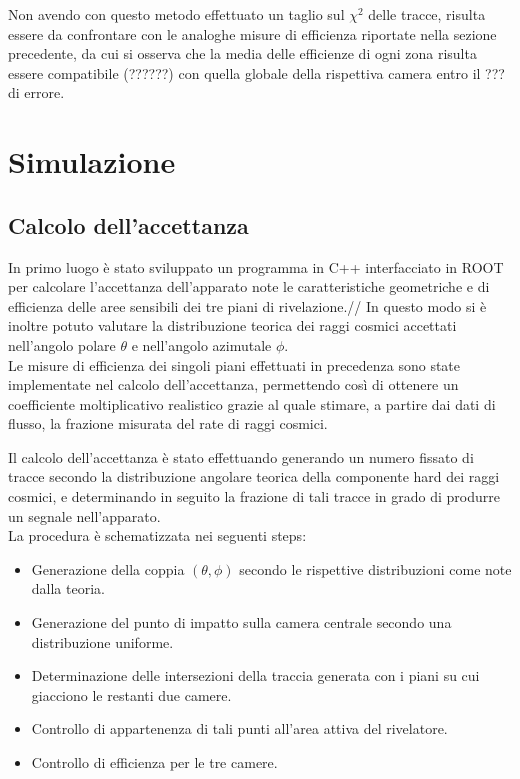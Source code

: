 \documentclass[8pt]{extarticle}
\begin{document}
Non avendo con questo metodo effettuato un taglio sul $\chi^2$ delle tracce, risulta essere da confrontare con le analoghe misure di efficienza riportate nella sezione precedente, da cui si osserva che la media delle efficienze di ogni zona risulta essere compatibile (??????) con quella globale della rispettiva camera entro il ??? di errore.

\section{Simulazione}

\subsection{Calcolo dell'accettanza}
In primo luogo è stato sviluppato un programma in C++ interfacciato in ROOT per calcolare l’accettanza dell’apparato note le caratteristiche geometriche e di efficienza delle aree sensibili dei tre piani di rivelazione.//
In questo modo si è inoltre potuto valutare la distribuzione teorica dei raggi cosmici accettati nell’angolo polare $\theta$ e nell’angolo azimutale $\phi$. \\
Le misure di efficienza dei singoli piani effettuati in precedenza sono state implementate nel calcolo dell'accettanza, permettendo così di ottenere un coefficiente moltiplicativo realistico grazie al quale stimare, a partire dai dati di flusso, la frazione misurata del rate di raggi cosmici.

Il calcolo dell'accettanza è stato effettuando generando un numero fissato di tracce secondo la distribuzione angolare teorica della componente hard dei raggi cosmici, e determinando in seguito la frazione di tali tracce in grado di produrre un segnale nell'apparato.\\
La procedura è schematizzata nei seguenti steps:
\begin{itemize}
\item Generazione della coppia $(\theta, \phi)$ secondo le rispettive distribuzioni come note dalla teoria.
\item Generazione del punto di impatto sulla camera centrale secondo una distribuzione uniforme.
\item Determinazione delle intersezioni della traccia generata con i piani su cui giacciono le restanti due camere.
\item Controllo di appartenenza di tali punti all'area attiva del rivelatore.
\item Controllo di efficienza per le tre camere.
\end{itemize}
\end{document}
